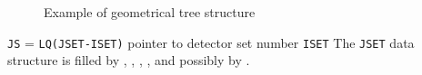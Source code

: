         
        

\begin{figure}[hbt]
     \centering
     \caption{Example of geometrical tree structure}
     \label{fg:hits199-1}
\end{figure}
 
{\tt JS} = {\tt LQ(JSET-ISET)} pointer to detector set number {\tt ISET}
The {\tt JSET} data structure is filled by , 
, , ,  
and possibly by .
 
